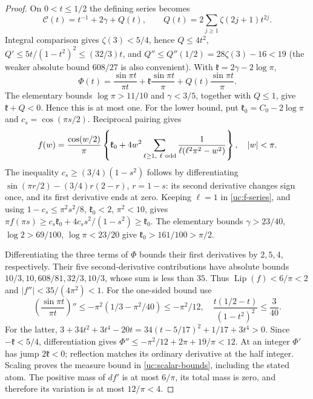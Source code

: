\begin{proof}
On $0<t\leq1/2$ the defining series becomes
\[
 \mathcal C(t)=t^{-1}+2\gamma+Q(t),\qquad
 Q(t)=2\sum_{j\geq1}\zeta(2j+1)t^{2j}.
\]
Integral comparison gives $\zeta(3)<5/4$, hence
$Q\leq4t^2$, $Q'\leq5t/(1-t^2)^2\leq(32/3)t$, and
$Q''\leq Q''(1/2)=28\zeta(3)-16<19$
(the weaker absolute bound $608/27$ is also convenient).
With $\mathfrak{k}=2\gamma-2\log\pi$,
\[
 \Phi(t)=\frac{\sin\pi t}{\pi t}
             +\mathfrak{k}\frac{\sin\pi t}\pi+Q(t)\frac{\sin\pi t}\pi.
\]
The elementary bounds $\log\pi>11/10$ and $\gamma<3/5$,
together with $Q\leq1$, give $\mathfrak{k}+Q<0$. Hence this is at most one. For the lower bound, put
$\mathfrak{k}_0=C_0-2\log\pi$ and $c_s=\cos(\pi s/2)$. Reciprocal pairing gives
\begin{equation}\label{uc:f-series}
 f(w)=\frac{\cos(w/2)}\pi
 \left\{\mathfrak{k}_0+4w^2\sum_{\ell\geq1,\ \ell\ {\rm odd}}
       \frac1{\ell(\ell^2\pi^2-w^2)}\right\},\quad |w|<\pi.
\end{equation}
The inequality $c_s\geq(3/4)(1-s^2)$ follows by differentiating
$\sin(\pi r/2)-(3/4)r(2-r)$, $r=1-s$: its second derivative
changes sign once, and its first derivative ends at zero. Keeping
$\ell=1$ in \eqref{uc:f-series}, and using
$1-c_s\leq\pi^2s^2/8$, $\mathfrak{k}_0<2$, $\pi^2<10$, gives
$\pi f(\pi s)\geq c_s\mathfrak{k}_0+4c_ss^2/(1-s^2)\geq \mathfrak{k}_0$.
The elementary bounds $\gamma>23/40$, $\log2>69/100$,
$\log\pi<23/20$ give $\mathfrak{k}_0>161/100>\pi/2$.

Differentiating the three terms of $\Phi$ bounds their first
 derivatives by $2,5,4$, respectively. Their five second-derivative
contributions have absolute bounds
$10/3,10,608/81,32/3,10/3$, whose sum is less than $35$.
Thus $\operatorname{Lip}(f)<6/\pi<2$ and $|f''|<35/(4\pi^2)<1$.
For the one-sided bound use
\[
 \left(\frac{\sin\pi t}{\pi t}\right)''
 \leq-\pi^2(1/3-\pi^2/40)\leq-\pi^2/12,
 \quad \frac{t(1/2-t)}{(1-t^2)^2}\leq\frac3{40}.
\]
For the latter, $3+34t^2+3t^4-20t
=34(t-5/17)^2+1/17+3t^4>0$.
Since $-\mathfrak{k}<5/4$, differentiation gives
$\Phi''\leq-\pi^2/12+2\pi+19/\pi<12$.
At an integer $\Phi'$ has jump $2\mathfrak{k}<0$; reflection matches its
ordinary derivative at the half integer. Scaling proves the measure
bound in \eqref{uc:scalar-bounds}, including the stated atom.
The positive mass of $df'$ is at most $6/\pi$, its total mass is
zero, and therefore its variation is at most $12/\pi<4$.


\end{proof}
